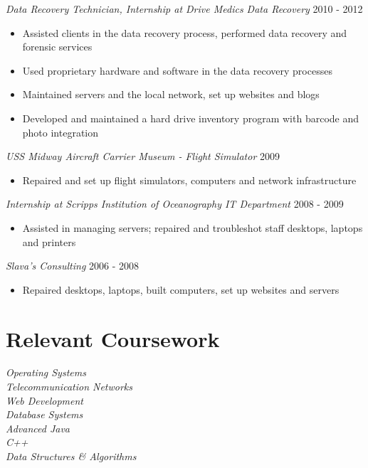 \documentclass[line]{tex/res}
\begin{document}
\begin{resume}
    {\sl Data Recovery Technician, Internship at Drive Medics Data Recovery} \hfill 2010 - 2012
    \begin{itemize} \itemsep -2pt
        \item Assisted clients in the data recovery process, performed data recovery and \\
            forensic services
        \item Used proprietary hardware and software in the data recovery processes
        \item Maintained servers and the local network, set up websites and blogs
        \item Developed and maintained a hard drive inventory program with barcode and \\
            photo integration
    \end{itemize}

    {\sl USS Midway Aircraft Carrier Museum - Flight Simulator} \hfill 2009
    \begin{itemize} \itemsep -2pt
        \item Repaired and set up flight simulators, computers and network infrastructure
    \end{itemize}

    {\sl Internship at Scripps Institution of Oceanography IT Department} \hfill 2008 - 2009
    \begin{itemize} \itemsep -2pt
        \item Assisted in managing servers; repaired and troubleshot staff desktops, laptops and printers
    \end{itemize}

    {\sl Slava's Consulting} \hfill 2006 - 2008
    \begin{itemize} \itemsep -2pt
        \item Repaired desktops, laptops, built computers, set up websites and servers
    \end{itemize}

\section{Relevant Coursework}
    {\sl Operating Systems } \\
    {\sl Telecommunication Networks } \\
    {\sl Web Development } \\
    {\sl Database Systems } \\
    {\sl Advanced Java} \\
    {\sl C++} \\
    {\sl Data Structures \& Algorithms}


\end{resume}
\end{document}
